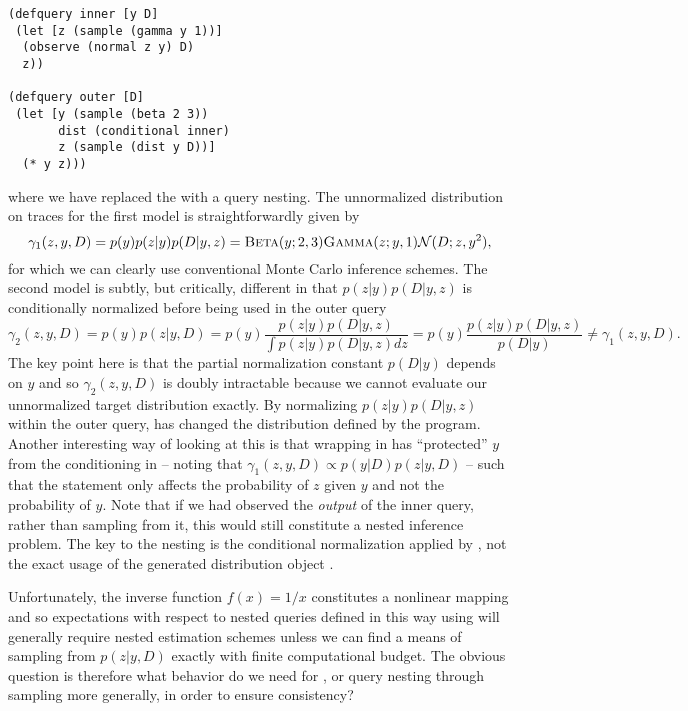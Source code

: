 \begin{lstlisting}[basicstyle=\ttfamily\footnotesize,multicols=2,frame=none]
(defquery inner [y D]
 (let [z (sample (gamma y 1))]
  (observe (normal z y) D)
  z))
  
(defquery outer [D]
 (let [y (sample (beta 2 3))
       dist (conditional inner)
       z (sample (dist y D))]
  (* y z)))
\end{lstlisting}
\vspace{-15pt}
where we have replaced the  with a query nesting.  The unnormalized distribution on
traces for the first model is straightforwardly given by
\[
\gamma_1(z,y,D) = p(y)p(z|y)p(D|y,z) = \textsc{Beta}(y;2,3) \textsc{Gamma}(z;y,1) \mathcal{N}(D;z,y^2),
\]
for which we can clearly use conventional Monte Carlo inference schemes.  The second model
is subtly, but critically, different in that $p(z|y)p(D|y,z)$ is conditionally normalized 
before being used in the outer query
\[
\gamma_2(z,y,D) = p(y)p(z|y,D) = p(y)\frac{p(z|y)p(D|y,z)}{\int p(z|y)p(D|y,z)dz} = p(y)\frac{p(z|y)p(D|y,z)}{p(D|y)} \neq \gamma_1(z,y,D).
\]
The key point here is that the partial normalization constant $p(D|y)$ depends on $y$ and so 
$\gamma_2(z,y,D)$ is doubly intractable because we cannot evaluate our unnormalized target
distribution exactly.  By normalizing $p(z|y)p(D|y,z)$ within the outer query, 
 \conditional has changed the distribution defined by the program.  Another interesting way of looking at this
 is that wrapping  in \conditional has ``protected'' $y$ from the conditioning 
 in  -- noting
 that $\gamma_1 (z,y,D) \propto p(y|D)p(z|y,D)$ -- such that the \observe statement only affects the probability
 of $z$ given $y$ and not the probability of $y$.
Note that if we had observed the \emph{output} of the inner query, rather than sampling
 from it, this would still constitute a nested inference problem.  The key to the nesting
 is the conditional normalization applied by \conditional, not the exact usage of the generated 
 distribution object .
 
 Unfortunately, the inverse function $f(x) = 1/x$ constitutes
a nonlinear mapping and so expectations with respect to nested queries defined in this way using
\conditional will generally require nested estimation schemes unless we can find a means of
sampling from $p(z|y,D)$ exactly with finite computational budget.
The obvious question is therefore what behavior do we need for \conditional, or query nesting through sampling
more generally, in order to ensure consistency?  

